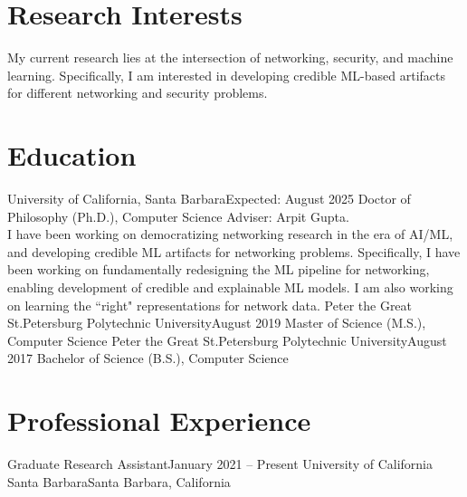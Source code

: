 \documentclass{scv}
\begin{document}

\section{Research Interests}
    \justifying
    My current research lies at the intersection of networking, security, and machine learning. Specifically, I am interested in developing credible ML-based artifacts for different networking and security problems.
\vspace{-10pt}

\section{Education}
  \resumeSubHeadingListStart
    \resumeSubheadingWithText
      {University of California, Santa Barbara}{Expected: August 2025}
      {Doctor of Philosophy (Ph.D.), Computer Science}{}
      {
        Adviser: Arpit Gupta.\\
        I have been working on democratizing networking research in the era of AI/ML, and developing credible ML artifacts for networking problems. Specifically, I have been working on fundamentally redesigning the ML pipeline for networking, enabling development of credible and explainable ML models. I am also working on learning the ``right" representations for network data.}{}
    \resumeSubheading
      {Peter the Great St.Petersburg Polytechnic University}{August 2019}
      {Master of Science (M.S.), Computer Science}{}
    \resumeSubheading
      {Peter the Great St.Petersburg Polytechnic University}{August 2017}
      {Bachelor of Science (B.S.), Computer Science}{}
  \resumeSubHeadingListEnd
    
\vspace{-10pt}
\section{Professional Experience}
  \resumeSubHeadingListStart

    \resumeSubheading 
      {Graduate Research Assistant}{January 2021 -- Present}
      {University of California Santa Barbara}{Santa Barbara, California}
      \resumeItemListStart
      \resumeItemListEnd
\end{document}
